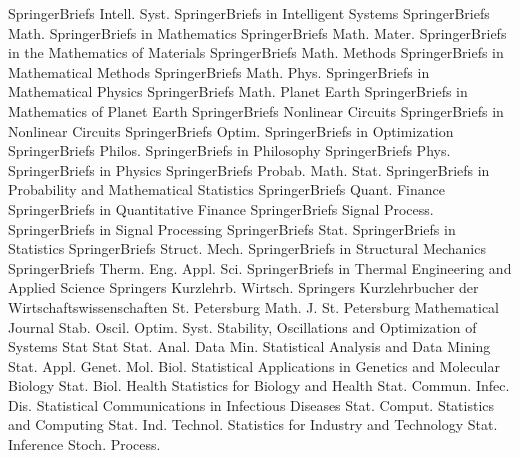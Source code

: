 {SpringerBriefs Intell. Syst.}
{SpringerBriefs in Intelligent Systems}
{SpringerBriefs Math.}
{SpringerBriefs in Mathematics}
{SpringerBriefs Math. Mater.}
{SpringerBriefs in the Mathematics of Materials}
{SpringerBriefs Math. Methods}
{SpringerBriefs in Mathematical Methods}
{SpringerBriefs Math. Phys.}
{SpringerBriefs in Mathematical Physics}
{SpringerBriefs Math. Planet Earth}
{SpringerBriefs in Mathematics of Planet Earth}
{SpringerBriefs Nonlinear Circuits}
{SpringerBriefs in Nonlinear Circuits}
{SpringerBriefs Optim.}
{SpringerBriefs in Optimization}
{SpringerBriefs Philos.}
{SpringerBriefs in Philosophy}
{SpringerBriefs Phys.}
{SpringerBriefs in Physics}
{SpringerBriefs Probab. Math. Stat.}
{SpringerBriefs in Probability and Mathematical Statistics}
{SpringerBriefs Quant. Finance}
{SpringerBriefs in Quantitative Finance}
{SpringerBriefs Signal Process.}
{SpringerBriefs in Signal Processing}
{SpringerBriefs Stat.}
{SpringerBriefs in Statistics}
{SpringerBriefs Struct. Mech.}
{SpringerBriefs in Structural Mechanics}
{SpringerBriefs Therm. Eng. Appl. Sci.}
{SpringerBriefs in Thermal Engineering and Applied Science}
{Springers Kurzlehrb. Wirtsch.}
{Springers Kurzlehrbucher der Wirtschaftswissenschaften}
{St. Petersburg Math. J.}
{St. Petersburg Mathematical Journal}
{Stab. Oscil. Optim. Syst.}
{Stability, Oscillations and Optimization of Systems}
{Stat}
{Stat}
{Stat. Anal. Data Min.}
{Statistical Analysis and Data Mining}
{Stat. Appl. Genet. Mol. Biol.}
{Statistical Applications in Genetics and Molecular Biology}
{Stat. Biol. Health}
{Statistics for Biology and Health}
{Stat. Commun. Infec. Dis.}
{Statistical Communications in Infectious Diseases}
{Stat. Comput.}
{Statistics and Computing}
{Stat. Ind. Technol.}
{Statistics for Industry and Technology}
{Stat. Inference Stoch. Process.}
